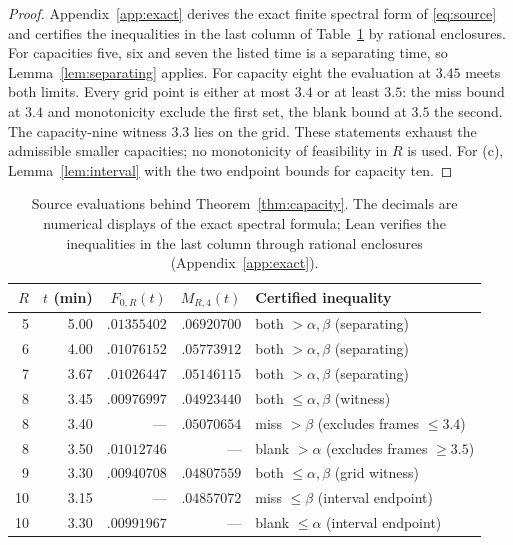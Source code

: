 \documentclass[11pt,a4paper]{article}
\theoremstyle{plain}
\theoremstyle{definition}
\theoremstyle{remark}
\begin{document}
\begin{proof}
Appendix~\ref{app:exact} derives the exact finite spectral form of \eqref{eq:source} and certifies the inequalities in the last column of Table~\ref{tab:certs} by rational enclosures. For capacities five, six and seven the listed time is a separating time, so Lemma~\ref{lem:separating} applies. For capacity eight the evaluation at $3.45$ meets both limits. Every grid point is either at most $3.4$ or at least $3.5$: the miss bound at $3.4$ and monotonicity exclude the first set, the blank bound at $3.5$ the second. The capacity-nine witness $3.3$ lies on the grid. These statements exhaust the admissible smaller capacities; no monotonicity of feasibility in $R$ is used. For (c), Lemma~\ref{lem:interval} with the two endpoint bounds for capacity ten.
\end{proof}

\begin{table}[htbp]\centering\small
\begin{tabular}{rrrrl}\toprule
$R$ & $t$ (min) & $F_{0,R}(t)$ & $M_{R,4}(t)$ & Certified inequality\\\midrule
5 & 5.00 & $.01355402$ & $.06920700$ & both $>\alpha,\beta$ (separating)\\
6 & 4.00 & $.01076152$ & $.05773912$ & both $>\alpha,\beta$ (separating)\\
7 & 3.67 & $.01026447$ & $.05146115$ & both $>\alpha,\beta$ (separating)\\
8 & 3.45 & $.00976997$ & $.04923440$ & both $\le\alpha,\beta$ (witness)\\
8 & 3.40 & --- & $.05070654$ & miss $>\beta$ (excludes frames $\le3.4$)\\
8 & 3.50 & $.01012746$ & --- & blank $>\alpha$ (excludes frames $\ge3.5$)\\
9 & 3.30 & $.00940708$ & $.04807559$ & both $\le\alpha,\beta$ (grid witness)\\
10 & 3.15 & --- & $.04857072$ & miss $\le\beta$ (interval endpoint)\\
10 & 3.30 & $.00991967$ & --- & blank $\le\alpha$ (interval endpoint)\\\bottomrule
\end{tabular}
\caption{Source evaluations behind Theorem~\ref{thm:capacity}. The decimals are numerical displays of the exact spectral formula; Lean verifies the inequalities in the last column through rational enclosures (Appendix~\ref{app:exact}).}
\label{tab:certs}
\end{table}
\end{document}
